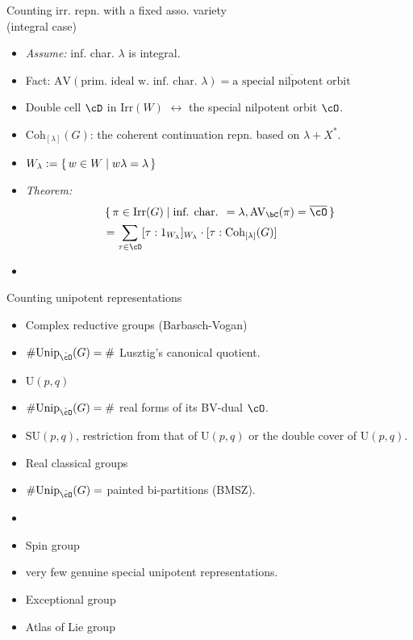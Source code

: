 \documentclass[t,mathserif,11pt,usenames,dvipsnames]{beamer}
\theoremstyle{plain}
\theoremstyle{definition}
\newcommand{\AV}{\mathrm{AV}}
\def\Irr{{\mathrm{Irr}}}
\def\Unip{{\mathrm{Unip}}}
\def\ckcO{{\check{\cO}}}
\def\blue{\color{blue}}
\let\oldemph\emph
\def\emph#1{\oldemph{\blue #1}}
\def\Coh{\mathrm{Coh}}
\def\U{\mathrm{U}}
\def\SU{\mathrm{SU}}
\begin{document}
\begin{frame}{Counting irr. repn. with a fixed asso. variety\\ (integral case)}
  \begin{itemize}
    \item \emph{Assume:} inf. char. $\lambda$ is integral.
    \item[] {\color{purple} Fact}: $\AV(\text{prim. ideal w. inf. char.
          $\lambda$})=\overline{\text{a special nilpotent orbit}}$
          \pause
    \item[] Double cell $\cD$ in $\Irr(W)$ $\longleftrightarrow$
          the special nilpotent orbit $\cO$.
    \item $\Coh_{[\lambda]}(G)$: the coherent continuation repn. based on
          $\lambda+X^{*}$. \pause
    \item $W_{\lambda}:=\set{w\in W | w \lambda = \lambda}$
    \item[] \emph{ Theorem: } 
          \[
          \begin{split}
            & \set{\pi \in \Irr(G) |\text{inf. char. }=\lambda,  \AV_\bC(\pi) = \overline{\cO}}\\
            &= \sum_{\tau\in \cD} [\tau:1_{W_\lambda}]_{W_{\lambda}} \cdot [\tau: \Coh_{[\lambda]}(G)]
          \end{split}
          \]
    \item[]
  \end{itemize}
\end{frame}

\begin{frame}{Counting unipotent representations}
  \begin{itemize}
    \item Complex reductive groups (Barbasch-Vogan)
    \item[] $\# \Unip_{\ckcO}(G) = \#$ Lusztig's canonical quotient. \pause
    \item $\U(p,q)$
    \item[] $\# \Unip_{\ckcO}(G)= \#$ real forms of its BV-dual $\cO$. \pause
    \item $\SU(p,q)$, restriction from that of $\U(p,q)$ or the double cover of $\U(p,q)$.
    \item Real classical groups
    \item[] $\# \Unip_{\ckcO}(G)= $ painted bi-partitions (BMSZ). \pause
    \item[] 
    \item Spin group
    \item[] very few genuine special unipotent representations. \pause
    \item Exceptional group
    \item[] Atlas of Lie group
  \end{itemize}
\end{frame}
\end{document}
